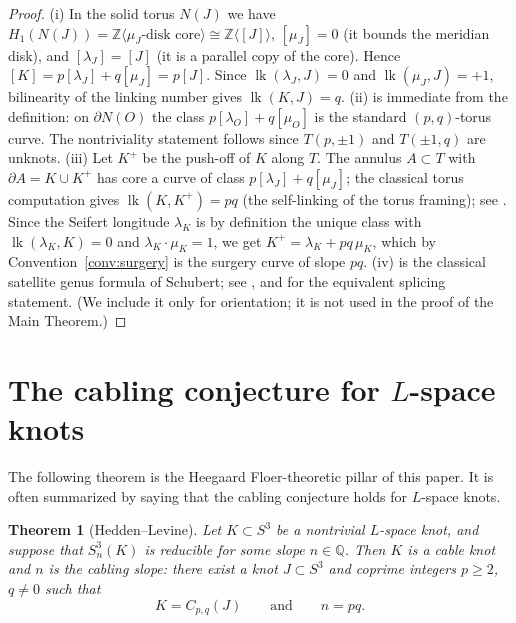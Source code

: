 \documentclass[11pt]{article}
\newtheorem{theorem}{Theorem}[section]
\theoremstyle{definition}
\theoremstyle{remark}
\numberwithin{equation}{section}
\begin{document}
\begin{proof}
(i) In the solid torus $N(J)$ we have $H_{1}(N(J))=\mathbb{Z}\langle
\mu_{J}\text{-disk core}\rangle\cong\mathbb{Z}\langle[J]\rangle$,
$[\mu_{J}]=0$ (it bounds the meridian disk), and
$[\lambda_{J}]=[J]$ (it is a parallel copy of the core).  Hence
$[K]=p[\lambda_{J}]+q[\mu_{J}]=p[J]$.  Since
$\operatorname{lk}(\lambda_{J},J)=0$ and
$\operatorname{lk}(\mu_{J},J)=+1$, bilinearity of the linking number
gives $\operatorname{lk}(K,J)=q$.
(ii) is immediate from the definition: on $\partial N(O)$ the class
$p[\lambda_{O}]+q[\mu_{O}]$ is the standard $(p,q)$-torus curve.  The
nontriviality statement follows since $T(p,\pm1)$ and $T(\pm1,q)$ are
unknots.
(iii) Let $K^{+}$ be the push-off of $K$ along $T$.  The annulus
$A\subset T$ with $\partial A=K\cup K^{+}$ has core a curve of class
$p[\lambda_{J}]+q[\mu_{J}]$; the classical torus computation gives
$\operatorname{lk}(K,K^{+})=pq$ (the self-linking of the torus framing);
see \cite[Chapter~7]{Ro90}.  Since the Seifert longitude $\lambda_{K}$ is
by definition the unique class with $\operatorname{lk}(\lambda_{K},K)=0$
and $\lambda_{K}\cdot\mu_{K}=1$, we get
$K^{+}=\lambda_{K}+pq\,\mu_{K}$, which by
Convention~\ref{conv:surgery} is the surgery curve of slope $pq$.
(iv) is the classical satellite genus formula of Schubert; see
\cite{Ro90}, and \cite{EN85} for the equivalent splicing statement.  (We
include it only for orientation; it is not used in the proof of the
Main Theorem.)
\end{proof}

\section{The cabling conjecture for $L$-space knots}\label{sec:cabling-conjecture}

The following theorem is the Heegaard Floer-theoretic pillar of this
paper.  It is often summarized by saying that the cabling conjecture
holds for $L$-space knots.

\begin{theorem}[Hedden--Levine]\label{thm:HL}
Let $K\subset S^{3}$ be a nontrivial $L$-space knot, and suppose that
$S^{3}_{n}(K)$ is reducible for some slope $n\in\mathbb{Q}$.  Then $K$ is
a cable knot and $n$ is the cabling slope: there exist a knot
$J\subset S^{3}$ and coprime integers $p\ge2$, $q\neq0$ such that
\[
K=C_{p,q}(J)
\qquad\text{and}\qquad
n=pq .
\]
\end{theorem}
\end{document}
